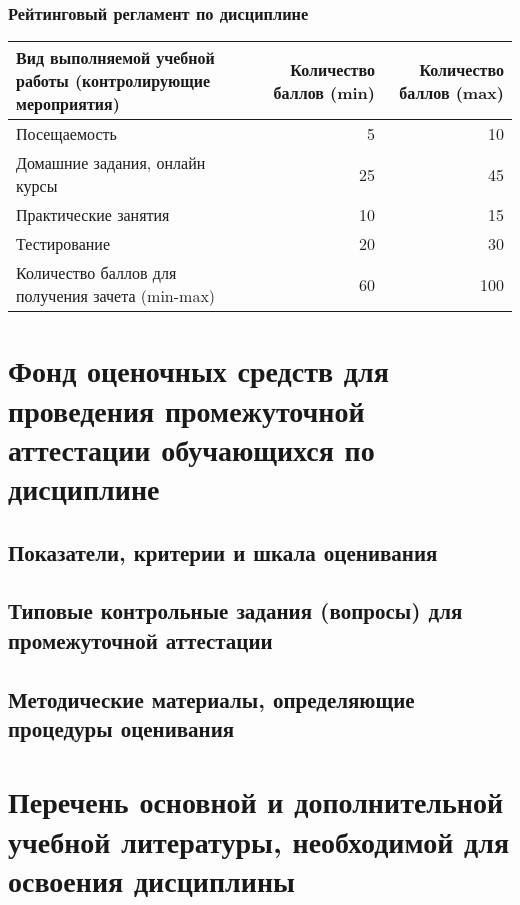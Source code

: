 \documentclass[a4paper,12pt]{article}
\begin{document}
\subsubsection*{Рейтинговый регламент по дисциплине}
\begin{longtable}{|>{\raggedright\arraybackslash}p{110mm}|r|r|}
\hline
\centering\arraybackslash Вид выполняемой учебной работы (контролирующие мероприятия) & 
\multicolumn{1}{p{20mm}|}{\centering\arraybackslash Количество баллов (min)} & 
\multicolumn{1}{p{20mm}|}{\centering\arraybackslash Количество баллов (max)} \\
\hline
Посещаемость & 5 & 10 \\ 
\hline
Домашние задания, онлайн курсы & 25 & 45 \\ 
\hline
Практические занятия & 10 & 15 \\ 
\hline
Тестирование & 20 & 30 \\ 
\hline
Количество баллов для получения зачета (min-max) & 60 & 100 \\ 

\hline
\end{longtable}


\section{Фонд оценочных средств для проведения промежуточной аттестации обучающихся по дисциплине}

\subsection{Показатели, критерии и шкала оценивания}
\subsection{Типовые контрольные задания (вопросы) для промежуточной аттестации}
\subsection{Методические материалы, определяющие процедуры оценивания}


\newpage
\section{Перечень основной и дополнительной учебной литературы, необходимой для освоения дисциплины}
\end{document}
